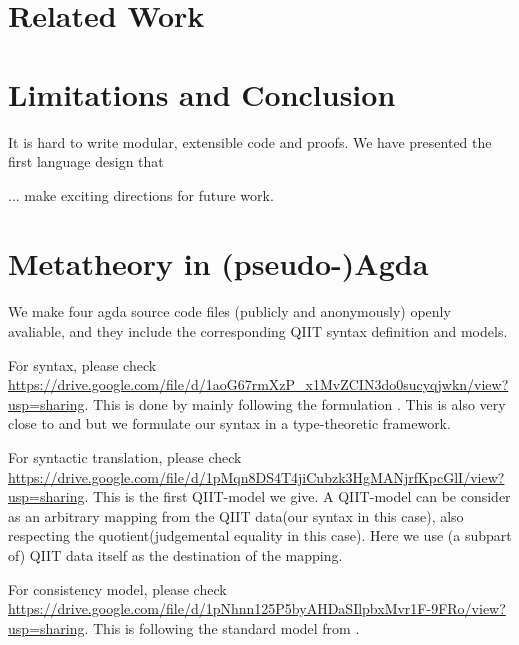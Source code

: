\section{Related Work}\label{sec:related-work}


\section{Limitations and Conclusion}
\label{sec:conclusion}

It is hard to write modular, extensible code and proofs.
We have presented the first language design that

... make exciting directions for future work.


\setlength{\bibsep}{.8ex}



\appendix

\section{Metatheory in (pseudo-)Agda}
We make four agda source code files (publicly and anonymously) openly avaliable, and they include the corresponding QIIT syntax definition and models. 

For syntax, please check \\ \href{https://drive.google.com/file/d/1aoG67rmXzP_x1MvZCIN3do0sucyqjwkn/view?usp=sharing}{https://drive.google.com/file/d/1aoG67rmXzP_x1MvZCIN3do0sucyqjwkn/view?usp=sharing}. This is done by mainly following the formulation \citet{altkap2016}. This is also very close to \citet{coquand2018canonicity} and \citet{sterling2019algebraic} but we formulate our syntax in a type-theoretic framework.

For syntactic translation, please check \\ \href{https://drive.google.com/file/d/1pMqn8DS4T4jiCubzk3HgMANjrfKpcGlI/view?usp=sharing}{https://drive.google.com/file/d/1pMqn8DS4T4jiCubzk3HgMANjrfKpcGlI/view?usp=sharing}. This is the first QIIT-model we give. A QIIT-model can be consider as an arbitrary mapping from the QIIT data(our syntax in this case), also respecting the quotient(judgemental equality in this case). Here we use (a subpart of) QIIT data itself as the destination of the mapping. 

For consistency model, please check \\ \href{https://drive.google.com/file/d/1pNhnn125P5byAHDaSIlpbxMvr1F-9FRo/view?usp=sharing}{https://drive.google.com/file/d/1pNhnn125P5byAHDaSIlpbxMvr1F-9FRo/view?usp=sharing}. This is following the standard model from \citet{altkap2016,kaposi2017type,kaposi2019gluing}.

